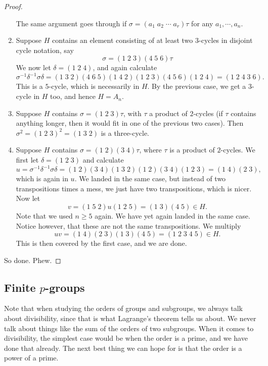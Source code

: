 \documentclass[a4paper]{article}
\begin{document}
\begin{proof}
\begin{enumerate}
      The same argument goes through if $\sigma = (a_1 \; a_2 \; \cdots \; a_r) \tau$ for any $a_1, \cdots, a_n$.
    \item Suppose $H$ contains an element consisting of at least two $3$-cycles in disjoint cycle notation, say
      \[
        \sigma = (1\; 2\; 3)(4\; 5\; 6)\tau
      \]
      We now let $\delta = (1\; 2\; 4)$, and again calculate
      \[
        \sigma^{-1} \delta^{-1}\sigma\delta = (1\; 3\; 2)(4\; 6\; 5)(1\; 4\; 2)(1\; 2\; 3)(4\; 5\; 6)(1\; 2\; 4) = (1\; 2\; 4\; 3\; 6).
      \]
      This is a $5$-cycle, which is necessarily in $H$. By the previous case, we get a $3$-cycle in $H$ too, and hence $H = A_n$.
    \item Suppose $H$ contains $\sigma = (1\; 2\; 3)\tau$, with $\tau$ a product of $2$-cycles (if $\tau$ contains anything longer, then it would fit in one of the previous two cases). Then $\sigma^2 = (1\; 2\; 3)^2 = (1\; 3\; 2)$ is a three-cycle.
    \item Suppose $H$ contains $\sigma = (1\; 2)(3\; 4)\tau$, where $\tau$ is a product of $2$-cycles. We first let $\delta = (1\; 2\; 3)$ and calculate
      \[
        u = \sigma^{-1}\delta^{-1}\sigma\delta = (1\; 2)(3\; 4)(1\; 3\; 2)(1\; 2)(3\; 4)(1\; 2\; 3) = (1\; 4)(2\; 3),
      \]
      which is again in $u$. We landed in the same case, but instead of two transpositions times a mess, we just have two transpositions, which is nicer. Now let
      \[
        v = (1\; 5\; 2)u (1\; 2\; 5) = (1\; 3)(4\; 5) \in H.
      \]
      Note that we used $n \geq 5$ again. We have yet again landed in the same case. Notice however, that these are not the same transpositions. We multiply
      \[
        uv = (1\; 4)(2\; 3)(1\; 3)(4\; 5) = (1\; 2\; 3\; 4\; 5) \in H.
      \]
      This is then covered by the first case, and we are done.
  \end{enumerate}
  So done. Phew.
\end{proof}

\subsection{Finite \texorpdfstring{$p$}{p}-groups}
Note that when studying the orders of groups and subgroups, we always talk about divisibility, since that is what Lagrange's theorem tells us about. We never talk about things like the sum of the orders of two subgroups. When it comes to divisibility, the simplest case would be when the order is a prime, and we have done that already. The next best thing we can hope for is that the order is a power of a prime.
\end{document}
